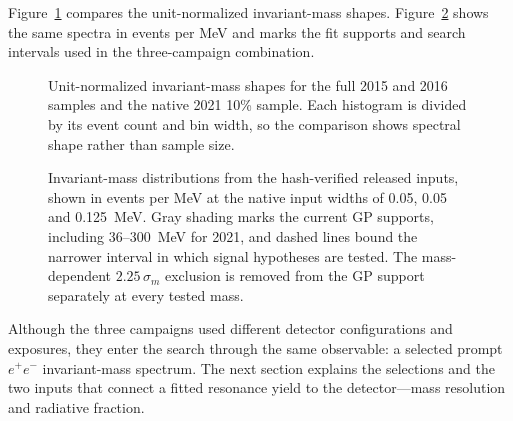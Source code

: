 Figure~\ref{fig:dataset-mass-shape-overlay} compares the unit-normalized invariant-mass
shapes. Figure~\ref{fig:dataset-mass-distributions-log} shows the same spectra in
events per MeV and marks the fit supports and search intervals used in the
three-campaign combination.

\begin{figure}[H]
\centering
{}
\caption{Unit-normalized invariant-mass shapes for the full 2015 and 2016 samples
and the native 2021 10\% sample. Each histogram is divided by its event count and bin
width, so the comparison shows spectral shape rather than sample size.}
\label{fig:dataset-mass-shape-overlay}
\end{figure}

\begin{figure}[H]
\centering
{}
\caption{Invariant-mass distributions from the hash-verified released inputs, shown in
events per MeV at the native input widths of 0.05, 0.05 and 0.125~MeV. Gray shading
marks the current GP supports, including 36--300~MeV for 2021, and dashed lines
bound the narrower interval in which signal hypotheses are tested. The mass-dependent
$2.25\,\sigma_m$ exclusion is removed from the GP support separately at every tested
mass.}
\label{fig:dataset-mass-distributions-log}
\end{figure}

Although the three campaigns used different detector configurations and exposures,
they enter the search through the same observable: a selected prompt $e^+e^-$
invariant-mass spectrum. The next section explains the selections and the two inputs
that connect a fitted resonance yield to the detector---mass resolution and radiative
fraction.
